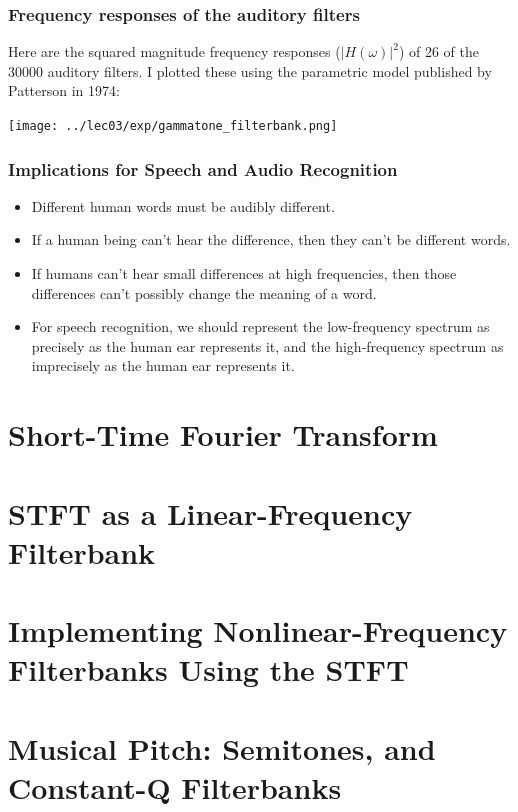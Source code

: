 \documentclass{beamer}
\begin{document}
\begin{frame}
  \frametitle{Frequency responses of the auditory filters}

  Here are the squared magnitude frequency responses ($|H(\omega)|^2$)
  of 26 of the 30000 auditory filters. I plotted these using the
  parametric model published by Patterson in 1974:
  \centerline{\texttt{[image: ../lec03/exp/gammatone\_filterbank.png]}}
\end{frame}

\begin{frame}
  \frametitle{Implications for Speech and Audio Recognition}

  \begin{itemize}
  \item Different human words must be audibly different.
  \item If a human being can't hear the difference, then they can't be different words.
  \item If humans can't hear small differences at high frequencies, then those differences
    can't possibly change the meaning of a word.
  \item For speech recognition, we should represent the low-frequency
    spectrum as precisely as the human ear represents it, and the
    high-frequency spectrum as imprecisely as the human ear represents
    it.
  \end{itemize}
\end{frame}

\section[STFT]{Short-Time Fourier Transform}
\setcounter{subsection}{1}

\section[Linear Frequency]{STFT as a Linear-Frequency Filterbank}
\setcounter{subsection}{1}

\section[Nonlinear Frequency]{Implementing Nonlinear-Frequency Filterbanks Using the STFT}
\setcounter{subsection}{1}

\section[Semitones]{Musical Pitch: Semitones, and Constant-Q Filterbanks}
\setcounter{subsection}{1}
\end{document}
